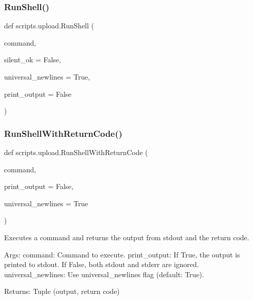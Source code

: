 \subsubsection{\texorpdfstring{RunShell()}{RunShell()}}
{\footnotesize\ttfamily def scripts.\+upload.\+Run\+Shell (\begin{DoxyParamCaption}\item[{}]{command,  }\item[{}]{silent\+\_\+ok = {\ttfamily False},  }\item[{}]{universal\+\_\+newlines = {\ttfamily True},  }\item[{}]{print\+\_\+output = {\ttfamily False} }\end{DoxyParamCaption})}

\mbox{\label{namespacescripts_1_1upload_a7d3bf1e9e3525da6086d1e03ea03bea5}} 
\subsubsection{\texorpdfstring{RunShellWithReturnCode()}{RunShellWithReturnCode()}}
{\footnotesize\ttfamily def scripts.\+upload.\+Run\+Shell\+With\+Return\+Code (\begin{DoxyParamCaption}\item[{}]{command,  }\item[{}]{print\+\_\+output = {\ttfamily False},  }\item[{}]{universal\+\_\+newlines = {\ttfamily True} }\end{DoxyParamCaption})}

\begin{DoxyVerb}Executes a command and returns the output from stdout and the return code.

Args:
  command: Command to execute.
  print_output: If True, the output is printed to stdout.
                If False, both stdout and stderr are ignored.
  universal_newlines: Use universal_newlines flag (default: True).

Returns:
  Tuple (output, return code)
\end{DoxyVerb}
 \mbox{\label{namespacescripts_1_1upload_aee58569b40f89a2a40ad2a0cf1b2a1d2}} 
